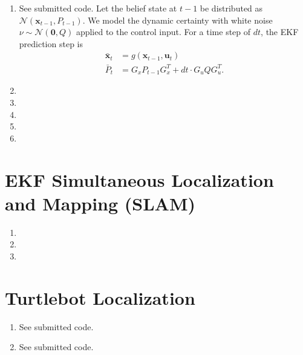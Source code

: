 \documentclass[12pt]{article}
\begin{document}
\begin{enumerate}
\begin{align*}
\begin{array}{cc}
		\sin(\theta_t) - \sin(\theta_{t-1}) & -V_t(\frac{1}{\omega_t}(\sin(\theta_t) - \sin(\theta_{t-1})) - \cos(\theta_t)dt) \\
		-\cos(\theta_t) + \cos(\theta_{t-1}) & V_t(\frac{1}{\omega_t}(\cos(\theta_t) - \cos(\theta_{t-1})) + \sin(\theta_t)dt) \\
		0 & \omega_tdt
		\end{array}\right).
	\end{align*}
	where $\theta_t := \theta_{t-1} + \omega_tdt$.
	\item See submitted code. Let the belief state at $t-1$ be distributed as $\mathcal{N}(\mathbf{x}_{t-1}, P_{t-1})$. We model the dynamic certainty with white noise $\nu \sim \mathcal{N}(\mathbf{0}, Q)$ applied to the control input. For a time step of $dt$, the EKF prediction step is
	\begin{align*}
		\bar{\mathbf{x}}_t &= g(\mathbf{x}_{t-1}, \mathbf{u}_t) \\
		\bar P_t &= G_xP_{t-1}G_x^T + dt \cdot G_uQG_u^T.
	\end{align*}
	\item 
	\item 
	\item 
	\item 
	\item 
\end{enumerate}

\section{EKF Simultaneous Localization and Mapping (SLAM)}
\begin{enumerate}
	\item 
	\item 
	\item 
\end{enumerate}

\section{Turtlebot Localization}
\begin{enumerate}
	\item See submitted code.
	\item See submitted code.
\end{enumerate}
\end{document}
